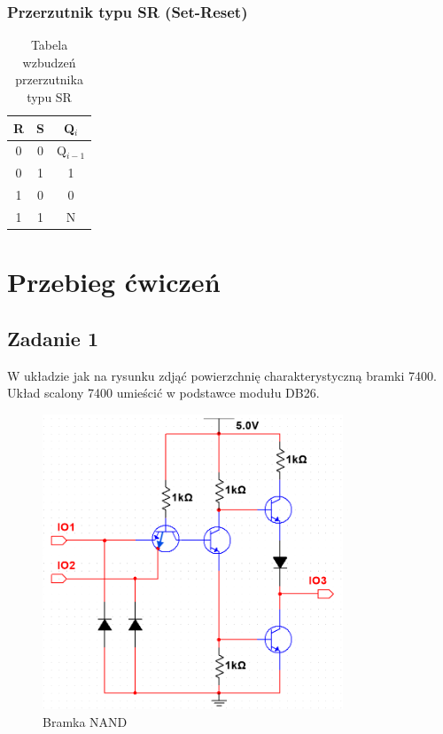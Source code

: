 \documentclass{article}
\begin{document}
    \subsubsection{Przerzutnik typu SR (Set-Reset)}
    \begin{table}[H]
    	\centering
    	\begin{tabular}{|c|c|c|}
    		\hline
    		\textbf{R} & \textbf{S} & \textbf{Q$_i$} \\ \hline
    		0 & 0 & Q$_{i-1}$ \\ 
    		0 & 1 & 1 \\ 
    		1 & 0 & 0 \\ 
    		1 & 1 & N \\ 
    		\hline
    	\end{tabular}
    	\caption{Tabela wzbudzeń przerzutnika typu SR}
    \end{table}
    

    \pagebreak

\pagebreak
\section{Przebieg ćwiczeń}
\subsection{Zadanie 1}
W układzie jak na rysunku zdjąć powierzchnię charakterystyczną bramki 7400. Układ
scalony 7400 umieścić w podstawce modułu DB26.

\begin{figure}[h]
    \centering
    \includegraphics[width=0.8\textwidth]{obwod1.PNG}
    \caption{Bramka NAND}
    \label{fig:moj_obrazek}
\end{figure}
\end{document}
